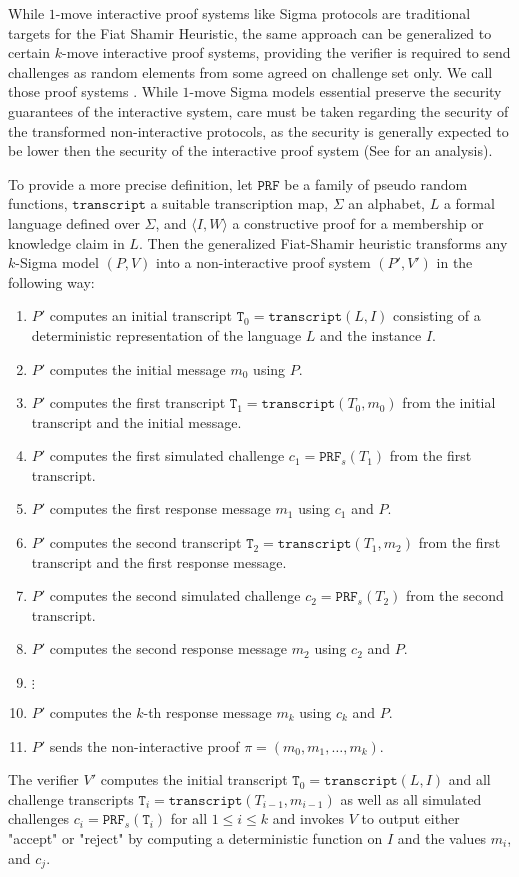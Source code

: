 While $1$-move interactive proof systems like Sigma protocols are traditional targets for the Fiat Shamir Heuristic, the same approach can be generalized to certain $k$-move interactive proof systems, providing the verifier is required to send challenges as random elements from some agreed on challenge set only. We call those proof systems . While $1$-move Sigma models essential preserve the security guarantees of the interactive system, care must be taken regarding the security of the transformed non-interactive protocols, as the security is generally expected to be lower then the security of the interactive proof system (See \cite{attema-21} for an analysis). 

To provide a more precise definition, let $\mathtt{PRF}$ be a family of pseudo random functions, $\mathtt{transcript}$ a suitable transcription map, $\Sigma$ an alphabet, $L$ a formal language defined over $\Sigma$, and $\langle I, W\rangle$ a constructive proof for a membership or knowledge claim in $L$. Then the generalized Fiat-Shamir heuristic transforms any $k$-Sigma model $(P,V)$ into a non-interactive proof system $(P',V')$ in the following way:
\begin{enumerate}
\label{def_sigma-model-fiat-shamir}
\item $P'$ computes an initial transcript $\mathtt{T}_0 = \mathtt{transcript}(L,I)$ consisting of a deterministic representation of the language $L$ and the instance $I$.
\item $P'$ computes the initial message $m_0$ using $P$.
\item $P'$ computes the first transcript $\mathtt{T}_1 = \mathtt{transcript}(T_0,m_0)$ from the initial transcript and the initial message.
\item $P'$ computes the first simulated challenge $c_1=\mathtt{PRF}_s(T_1)$ from the first transcript.
\item $P'$ computes the first response message $m_1$ using $c_1$ and $P$.
\item $P'$ computes the second transcript $\mathtt{T}_2 = \mathtt{transcript}(T_1,m_2)$ from the first transcript and the first response message.
\item $P'$ computes the second simulated challenge $c_2=\mathtt{PRF}_s(T_2)$ from the second transcript.
\item $P'$ computes the second response message $m_2$ using $c_2$ and $P$.
\item $\vdots$
\item $P'$ computes the $k$-th response message $m_{k}$ using $c_k$ and $P$.
\item $P'$ sends the non-interactive proof $\pi=(m_0,m_1,\ldots,m_{k})$.
\end{enumerate}
The verifier $V'$ computes the initial transcript $\mathtt{T}_0 = \mathtt{transcript}(L,I)$ and all challenge transcripts $\mathtt{T}_i = \mathtt{transcript}(T_{i-1},m_{i-1})$ as well as all simulated challenges $c_i=\mathtt{PRF}_s(\mathtt{T}_i)$ for all $1\leq i \leq k$ and invokes $V$ to output either "accept" or "reject" by computing a deterministic function on $I$ and the values $m_i$, and $c_j$.



